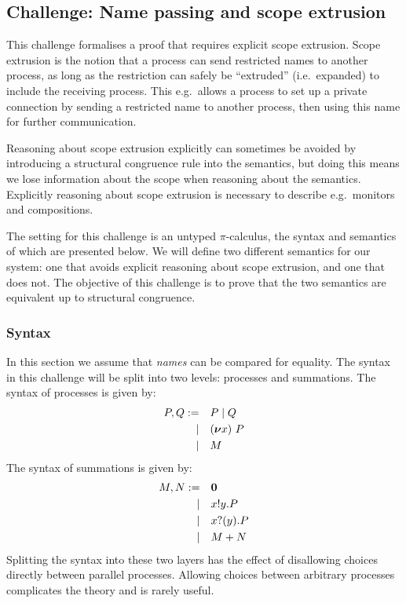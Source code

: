 \subsection{Challenge: Name passing and scope extrusion}
\label{sec:challenge:name-passing-scope-extrusion}

This challenge formalises a proof that requires explicit scope extrusion.
Scope extrusion is the notion that a process can send restricted names to another process, as long as the restriction can safely be ``extruded'' (i.e.\ expanded) to include the receiving process.
This e.g.\ allows a process to set up a private connection by sending a restricted name to another process, then using this name for further communication.

Reasoning about scope extrusion explicitly can sometimes be avoided by introducing a structural congruence rule into the semantics, but doing this means we lose information about the scope when reasoning about the semantics.
Explicitly reasoning about scope extrusion is necessary to describe e.g.\ monitors and compositions.

The setting for this challenge is an untyped \( \pi \)-calculus, the syntax and semantics of which are presented below.
We will define two different semantics for our system: one that avoids explicit reasoning about scope extrusion, and one that does not.
The objective of this challenge is to prove that the two semantics are equivalent up to structural congruence.

\subsubsection{Syntax}
In this section we assume that \emph{names}  can be compared for equality.
The syntax in this challenge will be split into two levels: processes and summations.
The syntax of processes is given by:
\begin{align*}
  P,Q :=&&& P \mid Q \\
  |&&& (\bm{\nu} x)~P \\
  |&&& M
\end{align*}
The syntax of summations is given by:
\begin{align*}
  M,N :=&&& \bm{0} \\
  |&&& x ! y . P \\
  |&&& x ? (y) . P \\
  |&&& M + N
\end{align*}
Splitting the syntax into these two layers has the effect of disallowing choices directly between parallel processes.
Allowing choices between arbitrary processes complicates the theory and is rarely useful.

